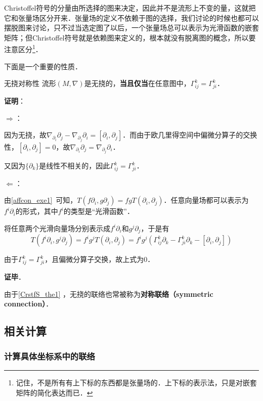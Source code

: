 Christoffel符号的分量由所选择的图来决定，因此并不是流形上不变的量，这就把它和张量场区分开来．张量场的定义不依赖于图的选择，我们讨论的时候也都可以摆脱图来讨论，只不过当选定图了以后，一个张量场总可以表示为光滑函数的嵌套矩阵；但Christoffel符号就是依赖图来定义的，根本就没有脱离图的概念，所以要注意区分\footnote{记住，不是所有有上下标的东西都是张量场的．上下标的表示法，只是对嵌套矩阵的简化表达而已．}．


下面是一个重要的性质．

\begin{theorem}{无挠对称性}\label{CrstfS_the1}
流形$(M, \nabla)$是无挠的，\textbf{当且仅当}在任意图中，$\Gamma^k_{ij}=\Gamma^k_{ji}$．
\end{theorem}

\textbf{证明}：

$\Rightarrow$：

因为无挠，故$\nabla_{\partial_i}\partial_j-\nabla_{\partial_j}\partial_i=[\partial_i, \partial_j]$．而由于欧几里得空间中偏微分算子的交换性，$[\partial_i, \partial_j]=0$，故$\nabla_{\partial_i}\partial_j=\nabla_{\partial_j}\partial_i$．

又因为$\{\partial_k\}$是线性不相关的，因此$\Gamma^k_{ij}=\Gamma^k_{ji}$．

$\Leftarrow$：

由\autoref{affcon_exe1}~可知，$T(f\partial_i, g\partial_j)=fgT(\partial_i, \partial_j)$．任意向量场都可以表示为$f^i\partial_i$的形式，其中$f^i$的类型是“光滑函数”．

将任意两个光滑向量场分别表示成$f^i\partial_i$和$g^j\partial_j$，于是有
\begin{equation}
T(f^i\partial_i, g^j\partial_j)=f^ig^jT(\partial_i, \partial_j)=f^ig^j(\Gamma^k_{ij}\partial_k-\Gamma^k_{ji}\partial_k-[\partial_i, \partial_j])
\end{equation}

由于$\Gamma^k_{ij}=\Gamma^k_{ji}$，且偏微分算子交换，故上式为$0$．

\textbf{证毕}．

由于\autoref{CrstfS_the1} ，无挠的联络也常被称为\textbf{对称联络（symmetric connection）}．


\subsection{相关计算}

\subsubsection{计算具体坐标系中的联络}

